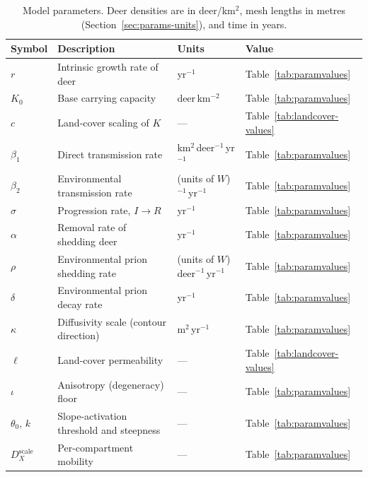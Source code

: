 \documentclass[11pt]{article}
\begin{document}
\begin{table}[h]
\centering
\caption{Model parameters. Deer densities are in deer/km$^2$, mesh lengths in metres (Section~\ref{sec:params-units}), and time in years.}
\label{tab:params}
\begin{tabular}{@{}llll@{}}
\toprule
Symbol & Description & Units & Value \\
\midrule
$r$        & Intrinsic growth rate of deer                 & yr$^{-1}$                        & Table~\ref{tab:paramvalues} \\
$K_0$      & Base carrying capacity                        & deer\,km$^{-2}$                  & Table~\ref{tab:paramvalues} \\
$c$        & Land-cover scaling of $K$                     & ---                              & Table~\ref{tab:landcover-values} \\
$\beta_1$  & Direct transmission rate                      & km$^{2}$\,deer$^{-1}$\,yr$^{-1}$ & Table~\ref{tab:paramvalues} \\
$\beta_2$  & Environmental transmission rate               & (units of $W$)$^{-1}$\,yr$^{-1}$ & Table~\ref{tab:paramvalues} \\
$\sigma$   & Progression rate, $I \to R$                   & yr$^{-1}$                        & Table~\ref{tab:paramvalues} \\
$\alpha$   & Removal rate of shedding deer                 & yr$^{-1}$                        & Table~\ref{tab:paramvalues} \\
$\rho$     & Environmental prion shedding rate             & (units of $W$)\,deer$^{-1}$\,yr$^{-1}$ & Table~\ref{tab:paramvalues} \\
$\delta$   & Environmental prion decay rate                & yr$^{-1}$                        & Table~\ref{tab:paramvalues} \\
$\kappa$   & Diffusivity scale (contour direction)         & m$^{2}$\,yr$^{-1}$               & Table~\ref{tab:paramvalues} \\
$\ell$     & Land-cover permeability                       & ---                              & Table~\ref{tab:landcover-values} \\
$\iota$    & Anisotropy (degeneracy) floor                 & ---                              & Table~\ref{tab:paramvalues} \\
$\theta_0,\,k$ & Slope-activation threshold and steepness  & ---                              & Table~\ref{tab:paramvalues} \\
$D_X^{\text{scale}}$ & Per-compartment mobility            & ---                              & Table~\ref{tab:paramvalues} \\
\bottomrule
\end{tabular}
\end{table}
\end{document}
